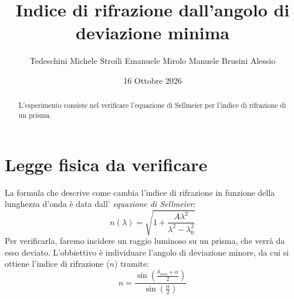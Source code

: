 \documentclass[10pt,twocolumn]{article}
\begin{document}


    \justifying 

      \title{\textbf{Indice di rifrazione dall'angolo di deviazione minima}}
      \author{Tedeschini Michele \hspace{0.7cm} Stroili Emanuele \hspace{0.7cm} Mirolo Manuele \hspace{0.7cm} Brusini Alessio} 
      \date{16 Ottobre 2026}
      \maketitle
      \onecolumn
      \tableofcontents
    \vspace{3cm}
      \begin{abstract}
        \centering
        \large
        L'esperimento consiste nel verificare l'equazione di Sellmeier per l'indice di rifrazione di un prisma. 
          
      \end{abstract}

      \newpage
    \restoregeometry
    \twocolumn



    \section{Legge fisica da verificare}
    La formula che descrive come cambia l'indice di rifrazione in funzione della lunghezza d'onda è data dall' \textit{equazione di Sellmeier}:
    \[
    n(\lambda) = \sqrt{1 + \frac{A\lambda^2}{\lambda^2-\lambda_0^2}}
    \]
    Per verificarla, faremo incidere un raggio luminoso su un prisma, che verrà da esso deviato. L'obbiettivo è individuare l'angolo di deviazione minore, da cui si ottiene l'indice di rifrazione ($n$) tramite:
    \begin{equation}
      n = \frac{\sin(\frac{\delta_{min}+\alpha}{2})}{\sin(\frac{\alpha}{2})}  
      \label{eq:1}
    \end{equation}
\end{document}
